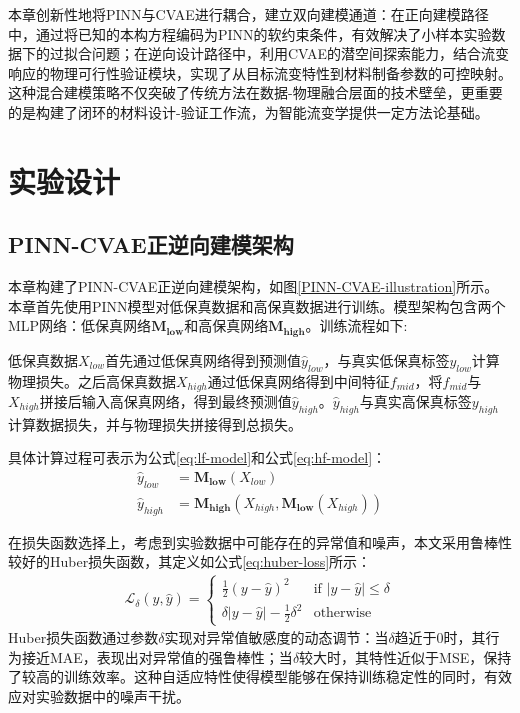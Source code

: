 本章创新性地将PINN与CVAE进行耦合，建立双向建模通道：在正向建模路径中，通过将已知的本构方程编码为PINN的软约束条件，有效解决了小样本实验数据下的过拟合问题；在逆向设计路径中，利用CVAE的潜空间探索能力，结合流变响应的物理可行性验证模块，实现了从目标流变特性到材料制备参数的可控映射。这种混合建模策略不仅突破了传统方法在数据-物理融合层面的技术壁垒，更重要的是构建了闭环的材料设计-验证工作流，为智能流变学提供一定方法论基础。
\section{实验设计}
\subsection{PINN-CVAE正逆向建模架构} \label{PINN-CVAE架构}
本章构建了PINN-CVAE正逆向建模架构，如图\ref{PINN-CVAE-illustration}所示。
本章首先使用PINN模型对低保真数据和高保真数据进行训练。模型架构包含两个MLP网络：低保真网络$\mathbf{M_{low}}$和高保真网络$\mathbf{M_{high}}$。训练流程如下:

低保真数据$X_{low}$首先通过低保真网络得到预测值$\hat{y}_{low}$，与真实低保真标签$y_{low}$计算物理损失。之后高保真数据$X_{high}$通过低保真网络得到中间特征$f_{mid}$，将$f_{mid}$与$X_{high}$拼接后输入高保真网络，得到最终预测值$\hat{y}_{high}$。$\hat{y}_{high}$与真实高保真标签$y_{high}$计算数据损失，并与物理损失拼接得到总损失。

具体计算过程可表示为公式\eqref{eq:lf-model}和公式\eqref{eq:hf-model}：
\begin{align}
  \hat{y}_{low}  & = \mathbf{M_{low}}(X_{low}) \label{eq:lf-model}                               \\
  \hat{y}_{high} & = \mathbf{M_{high}}(X_{high}, \mathbf{M_{low}}(X_{high})) \label{eq:hf-model}
\end{align}

在损失函数选择上，考虑到实验数据中可能存在的异常值和噪声，本文采用鲁棒性较好的Huber损失函数，其定义如公式\eqref{eq:huber-loss}所示：
\begin{equation}
  \begin{aligned}
    \mathcal{L}_\delta(y, \hat{y}) =
    \begin{cases}
      \frac{1}{2}(y - \hat{y})^2                 & \text{if } |y - \hat{y}| \le \delta    \\
      \delta |y - \hat{y}| - \frac{1}{2}\delta^2 & \text{otherwise} \label{eq:huber-loss}
    \end{cases}
  \end{aligned}
\end{equation}
Huber损失函数通过参数$\delta$实现对异常值敏感度的动态调节：当$\delta$趋近于0时，其行为接近MAE，表现出对异常值的强鲁棒性；当$\delta$较大时，其特性近似于MSE，保持了较高的训练效率。这种自适应特性使得模型能够在保持训练稳定性的同时，有效应对实验数据中的噪声干扰。

